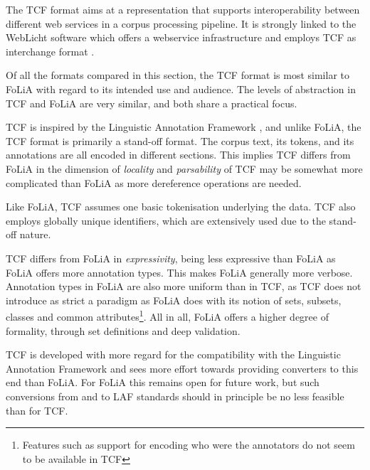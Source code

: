 \documentclass[a4paper,10pt,twoside]{article}
\begin{document}
The TCF format aims at a representation that supports interoperability between
different web services in a corpus processing pipeline. It is strongly linked to
the WebLicht software which offers a webservice infrastructure and employs
TCF as interchange format \cite{WEBLICHT}.

Of all the formats compared in this section, the TCF format is most similar to
FoLiA with regard to its intended use and audience. The levels of abstraction in
TCF and FoLiA are very similar, and both share a practical focus.

TCF is inspired by the Linguistic Annotation Framework \cite{LAF}, and unlike
FoLiA, the TCF format is primarily a stand-off format. The corpus text, its
tokens, and its annotations are all encoded in different sections.  This
implies TCF differs from FoLiA in the dimension of \emph{locality} and
\emph{parsability} of TCF may be somewhat more complicated than FoLiA as more
dereference operations are needed.


Like FoLiA, TCF assumes one basic tokenisation underlying the data. TCF also
employs globally unique identifiers, which are extensively used due to the
stand-off nature.

TCF differs from FoLiA in \emph{expressivity}, being less expressive than FoLiA
as FoLiA offers more annotation types. This makes FoLiA generally more verbose.
Annotation types in FoLiA are also more uniform than in TCF, as TCF does not
introduce as strict a paradigm as FoLiA does with its notion of sets, subsets,
classes and common attributes\footnote{Features such as support for encoding
who were the annotators do not seem to be available in TCF}.  All in all, FoLiA
offers a higher degree of formality, through set definitions and deep
validation.

TCF is developed with more regard for the compatibility with the Linguistic
Annotation Framework \cite{LAF} and sees more effort towards providing converters to this end
than FoLiA. For FoLiA this remains open for future work, but such conversions
from and to LAF standards should in principle be no less feasible than for TCF.

\end{document}

